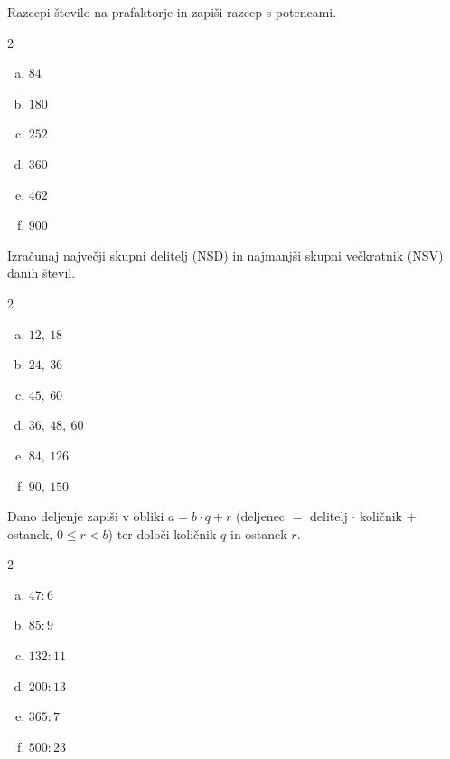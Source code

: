 \documentclass[a4paper,12pt]{letter}
\begin{document}
\begin{naloga}
Razcepi \v{s}tevilo na prafaktorje in zapi\v{s}i razcep s potencami.

\begin{multicols}{2}
\begin{enumerate}[a.)]
\item $84$
\item $180$
\item $252$
\item $360$
\item $462$
\item $900$
\end{enumerate}
\end{multicols}
\end{naloga}

\begin{naloga}
Izra\v{c}unaj najve\v{c}ji skupni delitelj (NSD) in najmanj\v{s}i skupni ve\v{c}kratnik (NSV) danih \v{s}tevil.

\begin{multicols}{2}
\begin{enumerate}[a.)]
\item $12,\ 18$
\item $24,\ 36$
\item $45,\ 60$
\item $36,\ 48,\ 60$
\item $84,\ 126$
\item $90,\ 150$
\end{enumerate}
\end{multicols}
\end{naloga}
\newpage

\begin{naloga}
Dano deljenje zapi\v{s}i v obliki $a=b\cdot q+r$ (deljenec $=$ delitelj $\cdot$ koli\v{c}nik $+$ ostanek,
$0\le r<b$) ter dolo\v{c}i koli\v{c}nik $q$ in ostanek $r$.

\begin{multicols}{2}
\begin{enumerate}[a.)]
\item $47:6$
\item $85:9$
\item $132:11$
\item $200:13$
\item $365:7$
\item $500:23$
\end{enumerate}
\end{multicols}
\end{naloga}
\end{document}
